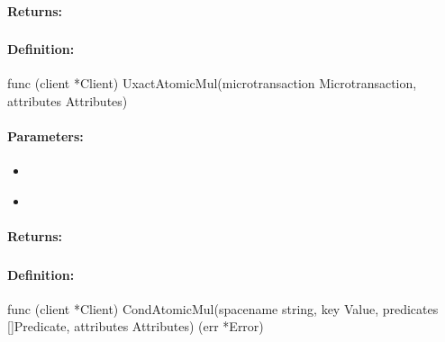 \paragraph{Returns:}


\pagebreak
\subsubsection{}
\label{api:Go:UxactAtomicMul}


\paragraph{Definition:}
\begin{gocode}
func (client *Client) UxactAtomicMul(microtransaction Microtransaction, attributes Attributes)
\end{gocode}

\paragraph{Parameters:}
\begin{itemize}[noitemsep]
\item {}\\

\item {}\\

\end{itemize}

\paragraph{Returns:}


\pagebreak
\subsubsection{}
\label{api:Go:CondAtomicMul}


\paragraph{Definition:}
\begin{gocode}
func (client *Client) CondAtomicMul(spacename string, key Value, predicates []Predicate, attributes Attributes) (err *Error)
\end{gocode}

